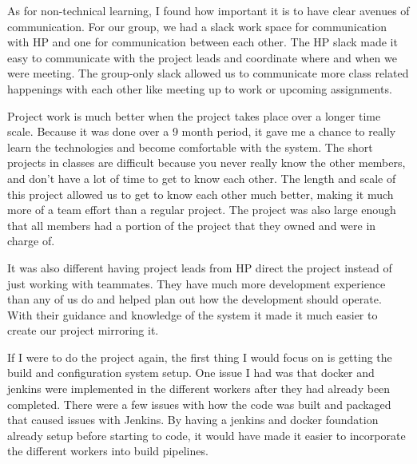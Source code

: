 \documentclass[onecolumn, draftclsnofoot,10pt, compsoc]{IEEEtran}
\begin{document}
As for non-technical learning, I found how important it is to have clear avenues of communication.
For our group, we had a slack work space for communication with HP and one for communication between each other.
The HP slack made it easy to communicate with the project leads and coordinate where and when we were meeting.
The group-only slack allowed us to communicate more class related happenings with each other like meeting up to work or upcoming assignments.

Project work is much better when the project takes place over a longer time scale.
Because it was done over a 9 month period, it gave me a chance to really learn the technologies and become comfortable with the system.
The short projects in classes are difficult because you never really know the other members, and don't have a lot of time to get to know each other.
The length and scale of this project allowed us to get to know each other much better, making it much more of a team effort than a regular project.
The project was also large enough that all members had a portion of the project that they owned and were in charge of.

It was also different having project leads from HP direct the project instead of just working with teammates.
They have much more development experience than any of us do and helped plan out how the development should operate.
With their guidance and knowledge of the system it made it much easier to create our project mirroring it.

If I were to do the project again, the first thing I would focus on is getting the build and configuration system setup.
One issue I had was that docker and jenkins were implemented in the different workers after they had already been completed.
There were a few issues with how the code was built and packaged that caused issues with Jenkins.
By having a jenkins and docker foundation already setup before starting to code, it would have made it easier to incorporate the different workers into build pipelines.

\clearpage





\clearpage
\end{document}
